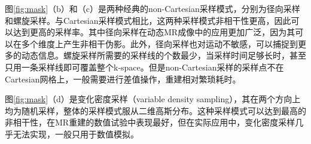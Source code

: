图\ref{fig:mask}（b）和（c）是两种经典的non-Cartesian采样模式，分别为径向采样\cite{block2007undersampled,glover1992projection}和螺旋采样\cite{meyer1992fast}。与Cartesian采样模式相比，这两种采样模式非相干性更高，因此可以达到更高的采样率。其中径向采样在动态MR成像中的应用更加广泛，因为其可以在多个维度上产生非相干伪影。此外，径向采样也对运动不敏感，可以捕捉到更多的动态信息\cite{gai1996correction}。螺旋采样所需要的采样线的个数最少，当采样时间足够长时，甚至只用一条采样线即可覆盖整个k-space。但是non-Cartesian采样的采样点不在Cartesian网格上，一般需要进行差值操作，重建相对繁琐耗时。

图\ref{fig:mask}（d）是变化密度采样（variable density sampling），其在两个方向上均为随机采样，整体的采样模式服从二维高斯分布。这种采样模式可以达到最高的非相干性，在MR重建的数值试验中表现最好，但在实际应用中，变化密度采样几乎无法实现，一般只用于数值模拟。
